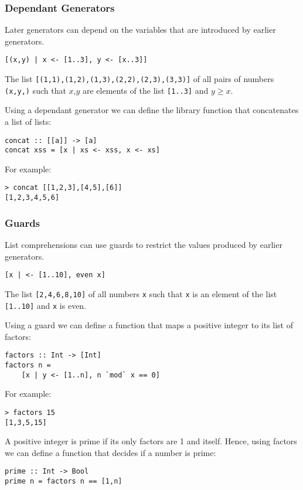 \begin{multicols}{2}
\subsubsection{Dependant Generators}
Later generators can depend on the variables that are introduced by earlier generators.
\begin{lstlisting}
[(x,y) | x <- [1..3], y <- [x..3]]
\end{lstlisting}
The list \lstinline{[(1,1),(1,2),(1,3),(2,2),(2,3),(3,3)]} of all pairs of numbers \lstinline{(x,y,)} such that $x$,$y$ are elements of the list \lstinline{[1..3]} and $y \geq x$.

Using a dependant generator we can define the library function that concatenates a list of lists:
\begin{lstlisting}
concat :: [[a]] -> [a]
concat xss = [x | xs <- xss, x <- xs]
\end{lstlisting}

For example:
\begin{lstlisting}
> concat [[1,2,3],[4,5],[6]]
[1,2,3,4,5,6]
\end{lstlisting}

\subsubsection{Guards}
List comprehensions can use guards to restrict the values produced by earlier generators.
\begin{lstlisting}
[x | <- [1..10], even x]
\end{lstlisting}
The list \lstinline{[2,4,6,8,10]} of all numbers \lstinline{x} such that \lstinline{x} is an element of the list \lstinline{[1..10]} and \lstinline{x} is even.

Using a guard we can define a function that maps a positive integer to its list of factors:
\begin{lstlisting}
factors :: Int -> [Int]
factors n = 
    [x | y <- [1..n], n `mod` x == 0]
\end{lstlisting}

For example:
\begin{lstlisting}
> factors 15
[1,3,5,15]
\end{lstlisting}

A positive integer is prime if its only factors are 1 and itself.
Hence, using factors we can define a function that decides if a number is prime:
\begin{lstlisting}
prime :: Int -> Bool
prime n = factors n == [1,n]
\end{lstlisting}


\end{multicols}
